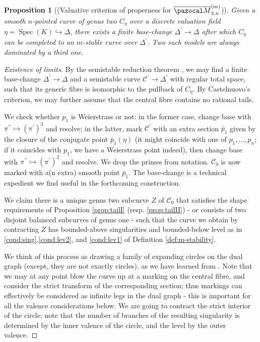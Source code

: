 \documentclass{compositio}
\renewcommand{\to}{\rightarrow}
\newcommand{\oM}{\overline{\pazocal M}}
\newcommand{\dvr}{\Delta}
\theoremstyle{plain}
\newtheorem{prop}[thm]{Proposition}
\theoremstyle{definition}
\theoremstyle{remark}
\begin{document}
\begin{prop}[(Valuative criterion of properness for $\oM^{(m)}_{2,n}$)]\label{prop:valcrit}
 Given a smooth $n$-pointed curve of genus two $C_\eta$ over a discrete valuation field $\eta=\operatorname{Spec}(K)\hookrightarrow\dvr$, there exists a finite base-change $\dvr^\prime\to\dvr$ after which $C_\eta$ can be completed to an \emph{$m$-stable} curve over $\dvr^\prime$. Two such models are always dominated by a third one.
\end{prop}
\begin{proof}[Existence of limits]
  By the semistable reduction theorem \cite[Corollary 2.7]{DM}, we may find a finite base-change $\dvr^\prime\to\dvr$ and a semistable curve $\mathcal C^\prime\to\dvr^\prime$ with regular total space, such that its generic fibre is isomorphic to the pullback of $C_\eta$. By Castelnuovo's criterion, we may further assume that the central fibre contains no rational tails.
  
  We check whether $p_1$ is Weierstrass or not: in the former case, change base with $\pi^{\prime\prime}\mapsto(\pi^\prime)^3$ and resolve; in the latter, mark $\mathcal C^\prime$ with an extra section $\bar p_1$ given by the closure of the conjugate point $\bar p_1(\eta)$ (it might coincide with one of $p_1,\ldots,p_n$; if it coincides with $p_1$, we have a Weierstrass point indeed), then change base with $\pi^{\prime\prime}\mapsto(\pi^\prime)^2$ and resolve. We drop the primes from notation. $\mathcal C_0$ is now marked with a(n extra) smooth point $\bar p_1$. The base-change is a technical expedient we find useful in the forthcoming construction.
  
  We claim there is a unique genus two subcurve $Z$ of $\mathcal C_0$ that satisfies the shape requirements of Proposition \ref{prop:tailI} (resp. \ref{prop:tailII}) - or consists of two disjoint balanced subcurves of genus one - such that the curve we obtain by contracting $Z$ has bounded-above singularities and bounded-below level as in \eqref{cond:sing},\eqref{cond:lev2}, and \eqref{cond:lev1} of Definition \ref{def:m-stability}.
  
  We think of this process as drawing a family of expanding circles on the dual graph (except, they are not exactly circles), as we have learned from \cite{RSPW1}. Note that we may at any point blow the curve up at a marking on the central fibre, and consider the strict transform of the corresponding section; thus markings can effectively be considered as infinite legs in the dual graph - this is important for all the valence considerations below. We are going to contract the strict interior of the circle; note that the number of branches of the resulting singularity is determined by the inner valence of the circle, and the level by the outer valence.
  

\end{proof}
\end{document}
